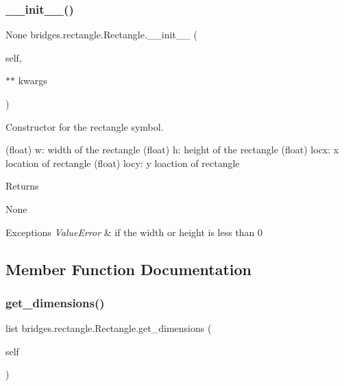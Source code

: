 \subsubsection{\texorpdfstring{\_\_init\_\_()}{\_\_init\_\_()}}
{\footnotesize\ttfamily  None bridges.\+rectangle.\+Rectangle.\+\_\+\+\_\+init\+\_\+\+\_\+ (\begin{DoxyParamCaption}\item[{}]{self,  }\item[{$\ast$$\ast$}]{kwargs }\end{DoxyParamCaption})}



Constructor for the rectangle symbol. 

\begin{DoxyVerb}       (float) w: width of the rectangle
       (float) h: height of the rectangle
       (float) locx: x location of rectangle
       (float) locy: y loaction of rectangle
\end{DoxyVerb}
 \begin{DoxyReturn}{Returns}


None
\end{DoxyReturn}

\begin{DoxyExceptions}{Exceptions}
{\em Value\+Error} & if the width or height is less than 0 \\
\hline
\end{DoxyExceptions}


\subsection{Member Function Documentation}
\mbox{\label{classbridges_1_1rectangle_1_1_rectangle_a7d7cd4157280043a0e25bb80ed0f9ca5}} 
\subsubsection{\texorpdfstring{get\_dimensions()}{get\_dimensions()}}
{\footnotesize\ttfamily  list bridges.\+rectangle.\+Rectangle.\+get\+\_\+dimensions (\begin{DoxyParamCaption}\item[{}]{self }\end{DoxyParamCaption})}



